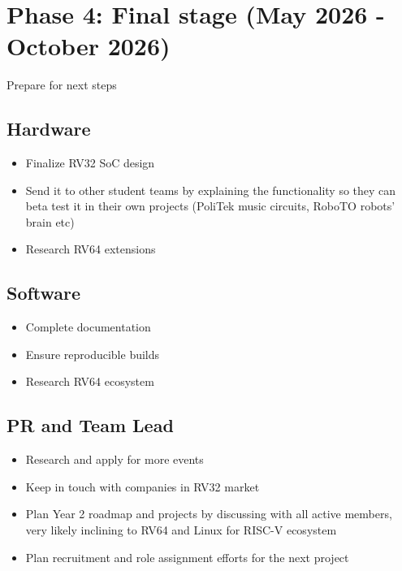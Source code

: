 \documentclass{article}
\begin{document}
\section{Phase 4: Final stage (May 2026 - October 2026)}
Prepare for next steps

\subsection{Hardware}
\begin{itemize}
    \item Finalize RV32 SoC design
    \item Send it to other student teams by explaining the functionality so they can beta test it in their own projects (PoliTek music circuits, RoboTO robots' brain etc)
    \item Research RV64 extensions
\end{itemize}

\subsection{Software}
\begin{itemize}
    \item Complete documentation
    \item Ensure reproducible builds
    \item Research RV64 ecosystem
\end{itemize}

\subsection{PR and Team Lead}
\begin{itemize}
    \item Research and apply for more events
    \item Keep in touch with companies in RV32 market
    \item Plan Year 2 roadmap and projects by discussing with all active members, very likely inclining to RV64 and Linux for RISC-V ecosystem
    \item Plan recruitment and role assignment efforts for the next project
\end{itemize}
\end{document}

